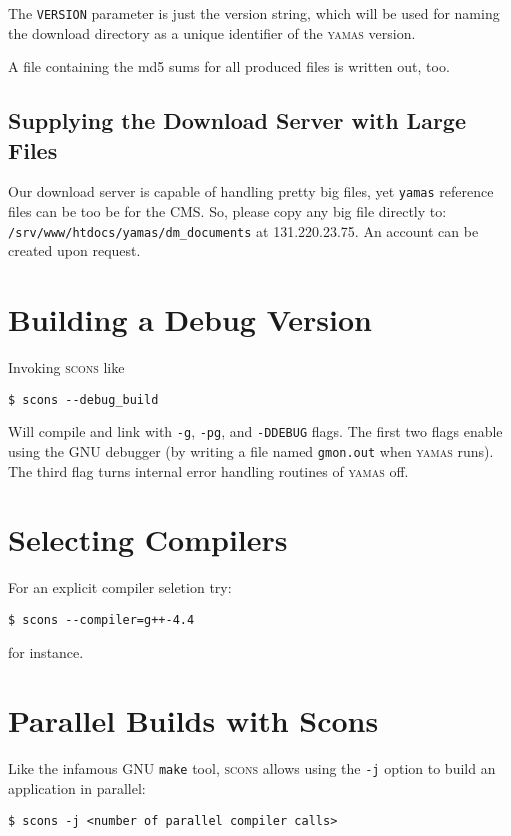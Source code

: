 The \texttt{VERSION} parameter is just the version string, which will be used for naming the download directory as a unique identifier of the \textsc{yamas} version.

A file containing the md5 sums for all produced files is written out, too.

\subsection{Supplying the Download Server with Large Files}

Our download server is capable of handling pretty big files, yet \texttt{yamas} reference files can be too be for the CMS. So, please copy any big file directly to:
\verb+/srv/www/htdocs/yamas/dm_documents+
at 131.220.23.75. An account can be created upon request.

\section{Building a Debug Version}

Invoking \textsc{scons} like
\begin{lstlisting}[style=shell]
$ scons --debug_build
\end{lstlisting}
Will compile and link with \verb+-g+, \verb+-pg+, and \verb+-DDEBUG+ flags. The first two flags enable using the GNU debugger (by writing a file named \verb+gmon.out+ when \textsc{yamas} runs). The third flag turns internal error handling routines of \textsc{yamas} off.

\section{Selecting Compilers}

For an explicit compiler seletion try:
\begin{lstlisting}[style=shell]
$ scons --compiler=g++-4.4
\end{lstlisting}
for instance.

\section{Parallel Builds with Scons}

Like the infamous GNU \verb+make+ tool, \textsc{scons} allows using the \verb+-j+ option to build an application in parallel:  
\begin{lstlisting}[style=shell]
$ scons -j <number of parallel compiler calls>
\end{lstlisting}

